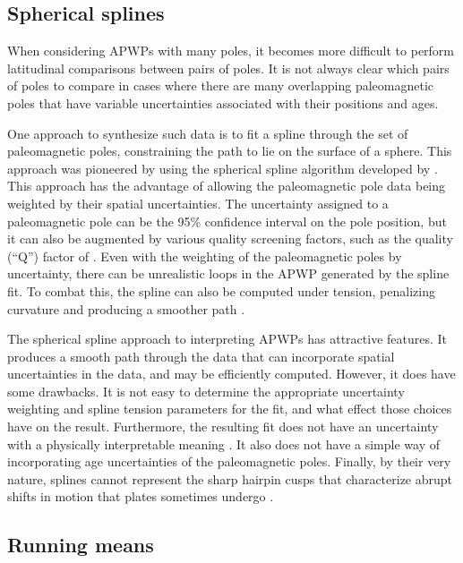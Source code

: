 \documentclass[11pt,letterpaper]{article}
\begin{document}
\subsection*{Spherical splines}
When considering APWPs with many poles, it becomes more difficult to perform latitudinal comparisons between pairs of poles. It is not always clear which pairs of poles to compare in cases where there are many overlapping paleomagnetic poles that have variable uncertainties associated with their positions and ages.

One approach to synthesize such data is to fit a spline through the set of paleomagnetic poles, constraining the path to lie on the surface of a sphere. This approach was pioneered by \cite{Torsvik1992a} using the spherical spline algorithm developed by \cite{Jupp1987a}. This approach has the advantage of allowing the paleomagnetic pole data being weighted by their spatial uncertainties. The uncertainty assigned to a paleomagnetic pole can be the 95\% confidence interval on the pole position, but it can also be augmented by various quality screening factors, such as the quality (``Q'') factor of \cite{Van-der-Voo1990a} \citep{Torsvik1992a}. Even with the weighting of the paleomagnetic poles by uncertainty, there can be unrealistic loops in the APWP generated by the spline fit. To combat this, the spline can also be computed under tension, penalizing curvature and producing a smoother path \citep{Torsvik1996a}.

The spherical spline approach to interpreting APWPs has attractive features. It produces a smooth path through the data that can incorporate spatial uncertainties in the data, and may be efficiently computed. However, it does have some drawbacks. It is not easy to determine the appropriate uncertainty weighting and spline tension parameters for the fit, and what effect those choices have on the result. Furthermore, the resulting fit does not have an uncertainty with a physically interpretable meaning \citep{Torsvik1996a}. It also does not have a simple way of incorporating age uncertainties of the paleomagnetic poles. Finally, by their very nature, splines cannot represent the sharp hairpin cusps that characterize abrupt shifts in motion that plates sometimes undergo \citep{Irving1972a, Gordon1984a}.

\subsection*{Running means}
\end{document}
